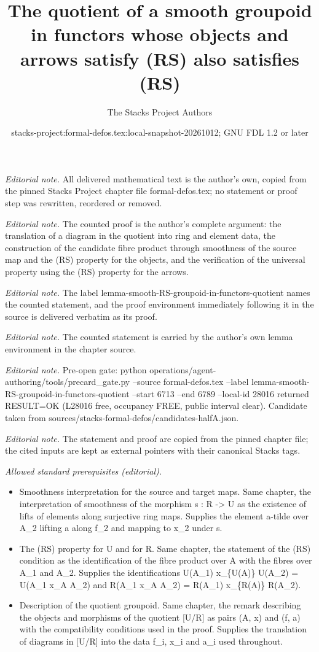 \documentclass[10pt,a4paper]{amsart}
\title{The quotient of a smooth groupoid in functors whose objects and arrows satisfy (RS) also satisfies (RS)}
\author{The Stacks Project Authors}
\date{stacks-project:formal-defos.tex:local-snapshot-20261012; GNU FDL 1.2 or later}
\theoremstyle{plain}
\theoremstyle{definition}
\theoremstyle{remark}
\numberwithin{equation}{subsection}
\begin{document}
\maketitle
\noindent\textit{Editorial note.} All delivered mathematical text is the author's own, copied from the pinned Stacks Project chapter file formal-defos.tex; no statement or proof step was rewritten, reordered or removed.\par\medskip
\noindent\textit{Editorial note.} The counted proof is the author's complete argument: the translation of a diagram in the quotient into ring and element data, the construction of the candidate fibre product through smoothness of the source map and the (RS) property for the objects, and the verification of the universal property using the (RS) property for the arrows.\par\medskip
\noindent\textit{Editorial note.} The label lemma-smooth-RS-groupoid-in-functors-quotient names the counted statement, and the proof environment immediately following it in the source is delivered verbatim as its proof.\par\medskip
\noindent\textit{Editorial note.} The counted statement is carried by the author's own lemma environment in the chapter source.\par\medskip
\noindent\textit{Editorial note.} Pre-open gate: python operations/agent-authoring/tools/precard\_gate.py --source formal-defos.tex --label lemma-smooth-RS-groupoid-in-functors-quotient --start 6713 --end 6789 --local-id 28016 returned RESULT=OK (L28016 free, occupancy FREE, public interval clear). Candidate taken from sources/stacks-formal-defos/candidates-halfA.json.\par\medskip
\noindent\textit{Editorial note.} The statement and proof are copied from the pinned chapter file; the cited inputs are kept as external pointers with their canonical Stacks tags.\par\medskip
\noindent\textit{Allowed standard prerequisites (editorial).}\begin{itemize}
\item Smoothness interpretation for the source and target maps. Same chapter, the interpretation of smoothness of the morphism s : R -> U as the existence of lifts of elements along surjective ring maps. Supplies the element a-tilde over A\_2 lifting a along f\_2 and mapping to x\_2 under s.
\item The (RS) property for U and for R. Same chapter, the statement of the (RS) condition as the identification of the fibre product over A with the fibres over A\_1 and A\_2. Supplies the identifications U(A\_1) x\_\{U(A)\} U(A\_2) = U(A\_1 x\_A A\_2) and R(A\_1 x\_A A\_2) = R(A\_1) x\_\{R(A)\} R(A\_2).
\item Description of the quotient groupoid. Same chapter, the remark describing the objects and morphisms of the quotient [U/R] as pairs (A, x) and (f, a) with the compatibility conditions used in the proof. Supplies the translation of diagrams in [U/R] into the data f\_i, x\_i and a\_i used throughout.
\end{itemize}\medskip
\end{document}
